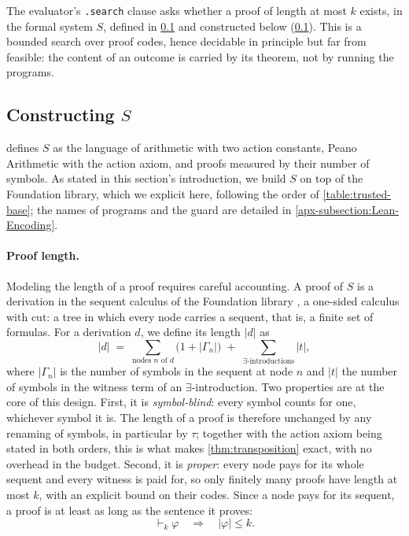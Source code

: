 \documentclass[twoside,11pt]{article}
\begin{document}
The evaluator's \texttt{.search} clause asks whether a proof of length at most $k$ exists, in the formal system $S$, defined in \cref{subsection:Lean-FormalSystem} and constructed below (\cref{subsection:Lean-FormalSystem}). This is a bounded search over proof codes, hence decidable in principle but far from feasible: the content of an outcome is carried by its theorem, not by running the programs.


\subsection{Constructing $S$}
\label{subsection:Lean-FormalSystem}

 defines $S$ as the language of arithmetic with two action constants, Peano Arithmetic with the action axiom, and proofs measured by their number of symbols. As stated in this section's introduction, we build $S$ on top of the Foundation library, which we explicit here, following the order of \cref{table:trusted-base}; the names of programs and the guard are detailed in \cref{apx-subsection:Lean-Encoding}.

\paragraph{Proof length.} Modeling the length of a proof requires careful accounting. A proof of $S$ is a derivation in the sequent calculus of the Foundation library \citep{foundation}, a one-sided calculus with cut: a tree in which every node carries a sequent, that is, a finite set of formulas. For a derivation $d$, we define its length $|d|$ as
\[
  |d| \;=\; \sum_{\text{nodes } n \text{ of } d} \bigl(1 + |\Gamma_n|\bigr) \;+\; \sum_{\exists\text{-introductions}} |t| ,
\]
where $|\Gamma_n|$ is the number of symbols in the sequent at node $n$ and $|t|$ the number of symbols in the witness term of an $\exists$-introduction. Two properties are at the core of this design. First, it is \emph{symbol-blind}: every symbol counts for one, whichever symbol it is. The length of a proof is therefore unchanged by any renaming of symbols, in particular by $\tau$; together with the action axiom being stated in both orders, this is what makes \cref{thm:transposition} exact, with no overhead in the budget. Second, it is \emph{proper}: every node pays for its whole sequent and every witness is paid for, so only finitely many proofs have length at most $k$, with an explicit bound on their codes. Since a node pays for its sequent, a proof is at least as long as the sentence it proves:
\[
  \vdash_k \varphi \quad\Longrightarrow\quad |\varphi| \le k .
\]
\end{document}
